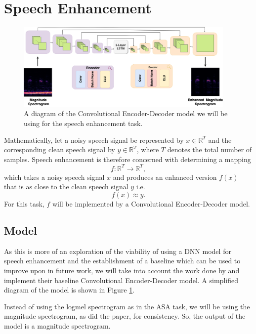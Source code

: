\documentclass[logo,bsc,singlespacing,parskip,online]{infthesis}
\begin{document}
\section{Speech Enhancement}
\label{sec:methodology-se}
\begin{figure}[h]
   \centering
   \includegraphics[width=0.95\textwidth]{se-model-diagram-3.png}
   \caption{A diagram of the Convolutional Encoder-Decoder model we will be using for the speech enhancement task.}
   \label{fig:speech-enhancement-model-architecture}
\end{figure}
Mathematically, let a noisy speech signal be represented by \(x \in \mathbb{R}^{T}\) and the corresponding clean speech signal by \(y \in \mathbb{R}^{T}\), where \(T\) denotes the total number of samples.
Speech enhancement is therefore concerned with determining a mapping 
\[
f: \mathbb{R}^{T} \to \mathbb{R}^{T},
\]
which takes a noisy speech signal \(x\) and produces an enhanced version \(f(x)\) that is as close to the clean speech signal \(y\) i.e.
\[
f(x) \approx y.
\]
For this task, $f$ will be implemented by a Convolutional Encoder-Decoder model.
\subsection{Model}
\label{sec:se-model}
As this is more of an exploration of the viability of using a DNN model for speech enhancement 
and the establishment of a baseline which can be used to improve upon in future work, 
we will take into account the work done by \citet{tan18_interspeech} and implement their baseline Convolutional Encoder-Decoder model.
A simplified diagram of the model is shown in Figure \ref{fig:speech-enhancement-model-architecture}.

Instead of using the logmel spectrogram as in the ASA task, we will be using the magnitude spectrogram, 
as did the paper, for consistency. So, the output of the model is a magnitude spectrogram. 
\end{document}
